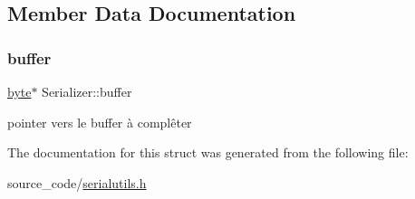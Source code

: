 \subsection{Member Data Documentation}
\mbox{\label{struct_serializer_a2c1edbc67c09dcfffe63194038fd9566}} 
\subsubsection{\texorpdfstring{buffer}{buffer}}
{\footnotesize\ttfamily \hyperlink{serialutils_8h_a0c8186d9b9b7880309c27230bbb5e69d}{byte}$\ast$ Serializer\+::buffer}

pointer vers le buffer à complêter 

The documentation for this struct was generated from the following file\+:\begin{DoxyCompactItemize}
\item 
source\+\_\+code/\hyperlink{serialutils_8h}{serialutils.\+h}\end{DoxyCompactItemize}

